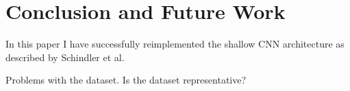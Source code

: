\documentclass[conference]{IEEEtran}
\begin{document}
\section{Conclusion and Future Work}

In this paper I have successfully reimplemented the shallow CNN architecture as described by Schindler et al.

Problems with the dataset. Is the dataset representative?



\end{document}
